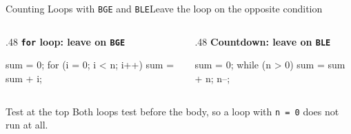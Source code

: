 \documentclass[9pt,aspectratio=169,xcolor=table]{beamer}
\begin{document}
{\beamerextras
\begin{frame}[fragile]{Counting Loops with \texttt{BGE} and \texttt{BLE}}{Leave the loop on the opposite condition}
    \begin{columns}[T]
    \begin{column}{.48\textwidth}
        \textbf{\texttt{for} loop: leave on \texttt{BGE}}
        \begin{cc}[basicstyle=\footnotesize\ttfamily]
sum = 0;
for (i = 0; i < n; i++) {
    sum = sum + i;
}
\end{cc}
    \end{column}
    \begin{column}{.48\textwidth}
        \textbf{Countdown: leave on \texttt{BLE}}
        \begin{cc}[basicstyle=\footnotesize\ttfamily]
sum = 0;
while (n > 0) {
    sum = sum + n;
    n--;
}
\end{cc}
    \end{column}
    \end{columns}

    \vspace{2mm}
    \begin{block}{Test at the top}
        Both loops test before the body, so a loop with
        \texttt{n = 0} does not run at all.
    \end{block}
\end{frame}
}
\end{document}

